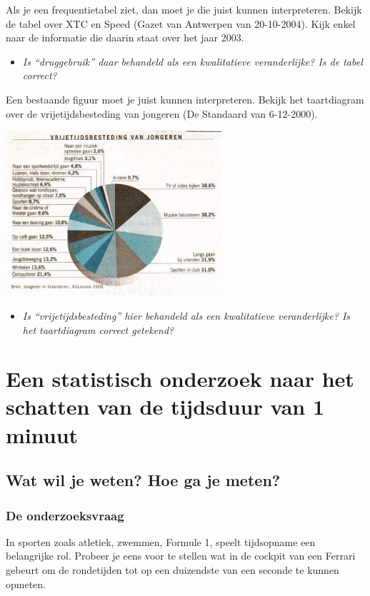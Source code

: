 \documentclass[11pt]{article}
\newcommand{\vraag}[2]{\begin{itemize}\item {\it #1} \vspace*{#2}\end{itemize}}
\begin{document}
Als je een frequentietabel ziet, dan moet je
die juist kunnen interpreteren. Bekijk de
tabel over XTC en Speed (Gazet van
Antwerpen van 20-10-2004). Kijk enkel
naar de informatie die daarin staat over het
jaar 2003.

\vraag{Is “druggebruik” daar
behandeld als een kwalitatieve
veranderlijke? Is de tabel correct?}{4cm}

Een bestaande figuur moet je juist kunnen interpreteren. Bekijk het taartdiagram over de
vrijetijdsbesteding van jongeren (De Standaard van 6-12-2000).

\begin{center}
  \includegraphics[width=0.6\textwidth]{cirkeldiagram-vrijetijdsbesteding}
\end{center}

\vraag{Is “vrijetijdsbesteding” hier behandeld als een kwalitatieve veranderlijke? Is het taartdiagram correct getekend?}{4cm}

\section{Een statistisch onderzoek naar het schatten van de tijdsduur van 1 minuut}

\subsection{Wat wil je weten? Hoe ga je meten?}

\subsubsection{De onderzoeksvraag}

In sporten zoals atletiek, zwemmen, Formule 1, speelt tijdsopname een belangrijke rol. Probeer je
eens voor te stellen wat in de cockpit van een Ferrari gebeurt om de rondetijden tot op een duizendste
van een seconde te kunnen opmeten.
\end{document}
